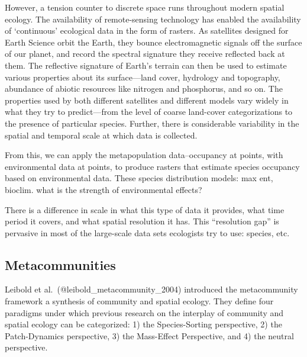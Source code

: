 However, a tension counter to discrete space runs throughout modern
spatial ecology. The availability of remote-sensing technology has
enabled the availability of `continuous' ecological data in the form of
rasters. As satellites designed for Earth Science orbit the Earth, they
bounce electromagnetic signals off the surface of our planet, and record
the spectral signature they receive reflected back at them. The
reflective signature of Earth's terrain can then be used to estimate
various properties about its surface---land cover, hydrology and
topography, abundance of abiotic resources like nitrogen and phosphorus,
and so on. The properties used by both different satellites and
different models vary widely in what they try to predict---from the
level of coarse land-cover categorizations to the presence of particular
species. Further, there is considerable variability in the spatial and
temporal scale at which data is collected.

From this, we can apply the metapopulation data--occupancy at points,
with environmental data at points, to produce rasters that estimate
species occupancy based on environmental data. These species
distribution models: max ent, bioclim. what is the strength of
environmental effects?

There is a difference in scale in what this type of data it provides,
what time period it covers, and what spatial resolution it has. This
``resolution gap'' is pervasive in most of the large-scale data sets
ecologists try to use: species, etc.

\hypertarget{metacommunities}{%
\subsection{Metacommunities}\label{metacommunities}}

Leibold et al.~(@leibold\_metacommunity\_2004) introduced the
metacommunity framework a synthesis of community and spatial ecology.
They define four paradigms under which previous research on the
interplay of community and spatial ecology can be categorized: 1) the
Species-Sorting perspective, 2) the Patch-Dynamics perspective, 3) the
Mass-Effect Perspective, and 4) the neutral perspective.

